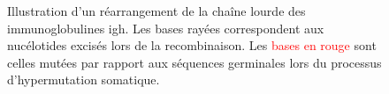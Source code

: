\begin{figure}[H]
\begin{tikzpicture}[node distance=0cm, thick, font=\tiny]
    \end{tikzpicture}
    \caption{Illustration d'un réarrangement de la chaîne lourde des immunoglobulines \gls{igh}.
    Les bases rayées correspondent aux nucélotides excisés lors de la recombinaison. 
    Les \textcolor{red}{bases en rouge} sont celles mutées par rapport aux séquences germinales lors du 
    processus d'hypermutation somatique.}
    \label{fig:igh}
\end{figure}
